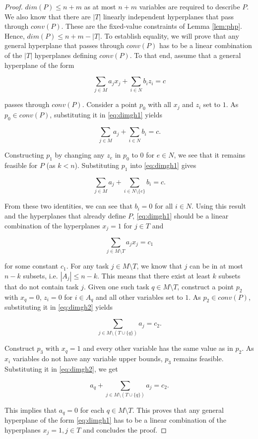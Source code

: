 \documentclass[12pt]{article}
\begin{document}
\begin{proof}
$dim(P) \leq n+m$ as at most $n+m$ variables are required to describe $P$. We also know that there are $|T|$ linearly independent hyperplanes that pass through $conv(P)$. These are the fixed-value constraints of Lemma \ref{lem:php}. Hence, $dim(P) \leq n + m - |T|$. To establish equality, we will prove that any general hyperplane that passes through $conv(P)$ has to be a linear combination of the $|T|$ hyperplanes defining $conv(P)$. To that end, assume that a general hyperplane of the form

\begin{equation} \label{eq:dimgh1}
\sum_{j \in M} a_j x_j + \sum_{i \in N} b_i z_i = c
\end{equation}

passes through $conv(P)$. Consider a point $p_0$ with all $x_j$ and $z_i$ set to $1$. As $p_0 \in conv(P)$, substituting it in \eqref{eq:dimgh1} yields

\[\sum_{j \in M} a_j + \sum_{i \in N} b_i = c.\]

Constructing $p_1$ by changing any $z_e$ in $p_0$ to $0$ for $e \in N$, we see that it remains feasible for $P$ (as $k < n$). Substituting $p_1$ into \eqref{eq:dimgh1} gives

\[\sum_{j \in M} a_j + \sum_{i \in N \setminus \{e\}} b_i = c.\]

From these two identities, we can see that $b_i = 0$ for all $i \in N$. Using this result and the hyperplanes that already define $P$, \eqref{eq:dimgh1} should be a linear combination of the hyperplanes $x_j = 1$ for $j \in T$ and

\begin{equation} \label{eq:dimgh2}
\sum_{j \in M \setminus T} a_j x_j = c_1
\end{equation}

for some constant $c_1$. For any task $j \in M \setminus T$, we know that $j$ can be in at most $n-k$ subsets, i.e. $|A_j| \leq n-k$. This means that there exist at least $k$ subsets that do not contain task $j$. Given one such task $q \in M \setminus T$, construct a point $p_2$ with $x_q = 0$, $z_i = 0$ for $i \in A_q$ and all other variables set to $1$. As $p_2 \in conv(P)$, substituting it in \eqref{eq:dimgh2} yields

\[\sum_{j \in M \setminus (T \cup \{q\})} a_j = c_2.\]

Construct $p_3$ with $x_q = 1$ and every other variable has the same value as in $p_2$. As $x_i$ variables do not have any variable upper bounds, $p_3$ remains feasible. Substituting it in \eqref{eq:dimgh2}, we get

\[a_q + \sum_{j \in M \setminus (T \cup \{q\})} a_j = c_2.\]

This implies that $a_q = 0$ for each $q \in M \setminus T$. This proves that any general hyperplane of the form \eqref{eq:dimgh1} has to be a linear combination of the hyperplanes $x_j = 1, j \in T$ and concludes the proof.
\end{proof}
\end{document}
